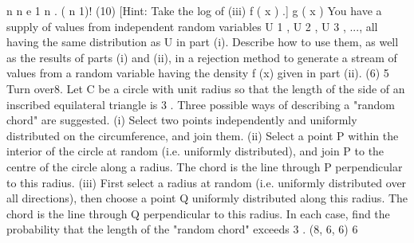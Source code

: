 n n e 1 n
.
( n 1)!
(10)
[Hint: Take the log of
(iii)
f ( x )
.]
g ( x )
You have a supply of values from independent random variables U 1 , U 2 , U 3 , ...,
all having the same distribution as U in part (i). Describe how to use them, as
well as the results of parts (i) and (ii), in a rejection method to generate a
stream of values from a random variable having the density f (x) given in
part (ii).
(6)
5
Turn over8.
Let C be a circle with unit radius so that the length of the side of an inscribed
equilateral triangle is 3 . Three possible ways of describing a "random chord" are
suggested.
(i) Select two points independently and uniformly distributed on the
circumference, and join them.
(ii) Select a point P within the interior of the circle at random (i.e. uniformly
distributed), and join P to the centre of the circle along a radius. The chord is
the line through P perpendicular to this radius.
(iii) First select a radius at random (i.e. uniformly distributed over all directions),
then choose a point Q uniformly distributed along this radius. The chord is the
line through Q perpendicular to this radius.
In each case, find the probability that the length of the "random chord" exceeds
3 .
(8, 6, 6)
6
